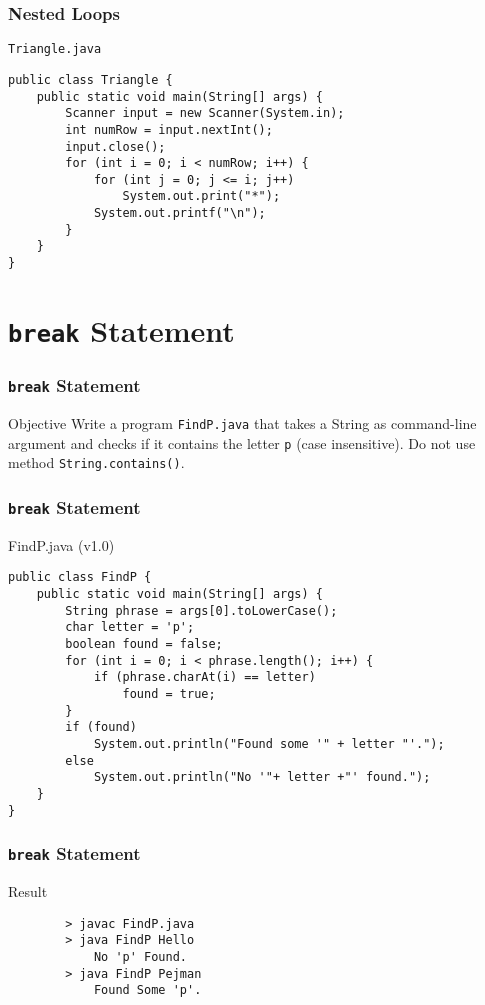 \documentclass[10pt, compress]{beamer}
\begin{document}
\begin{frame}[fragile]
	\frametitle{Nested Loops}
	\begin{block}{\texttt{Triangle.java}}
		\begin{verbatim}
public class Triangle {
	public static void main(String[] args) {
		Scanner input = new Scanner(System.in);
		int numRow = input.nextInt();
		input.close();
		for (int i = 0; i < numRow; i++) {
			for (int j = 0; j <= i; j++)
				System.out.print("*");
			System.out.printf("\n");
		}
	}
}
		\end{verbatim}
	\end{block}
\end{frame}


\section{\texttt{break} Statement}

\begin{frame}[fragile]
	\frametitle{\texttt{break} Statement}
	\begin{block}{Objective}
		Write a program \texttt{FindP.java} that takes a String as command-line argument and checks if it contains the letter \texttt{p} (case insensitive). Do not use method \texttt{String.contains()}.
	\end{block}
\end{frame}


\begin{frame}[fragile]
	\frametitle{\texttt{break} Statement}
	\begin{block}{FindP.java (v1.0)}
		\begin{verbatim}
public class FindP {
	public static void main(String[] args) {
		String phrase = args[0].toLowerCase();
		char letter = 'p';
		boolean found = false;
		for (int i = 0; i < phrase.length(); i++) {
			if (phrase.charAt(i) == letter)
				found = true;
		}
		if (found)
			System.out.println("Found some '" + letter "'.");
		else
			System.out.println("No '"+ letter +"' found.");
	}
}
		\end{verbatim}
	\end{block}
\end{frame}

\begin{frame}[fragile]
	\frametitle{\texttt{break} Statement}
	\begin{block}{Result}
		\begin{verbatim}
		> javac FindP.java
		> java FindP Hello
			No 'p' Found.
		> java FindP Pejman
			Found Some 'p'.
		\end{verbatim}
	\end{block}
\end{frame}
\end{document}
